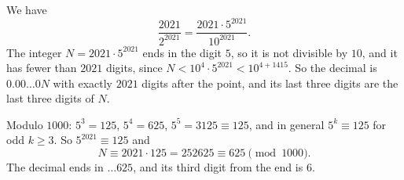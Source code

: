 We have
\[\dfrac{2021}{2^{2021}}=\dfrac{2021\cdot5^{2021}}{10^{2021}}.\]
The integer $N=2021\cdot5^{2021}$ ends in the digit $5$, so it is not divisible by $10$, and it has fewer than $2021$ digits, since $N<10^4\cdot5^{2021}<10^{4+1415}$. So the decimal is $0.00\ldots0N$ with exactly $2021$ digits after the point, and its last three digits are the last three digits of $N$.

Modulo $1000$: $5^3=125$, $5^4=625$, $5^5=3125\equiv125$, and in general $5^k\equiv125$ for odd $k\ge3$. So $5^{2021}\equiv125$ and
\[N\equiv2021\cdot125=252625\equiv625\pmod{1000}.\]
The decimal ends in $\ldots625$, and its third digit from the end is $\boxed{6}$.
